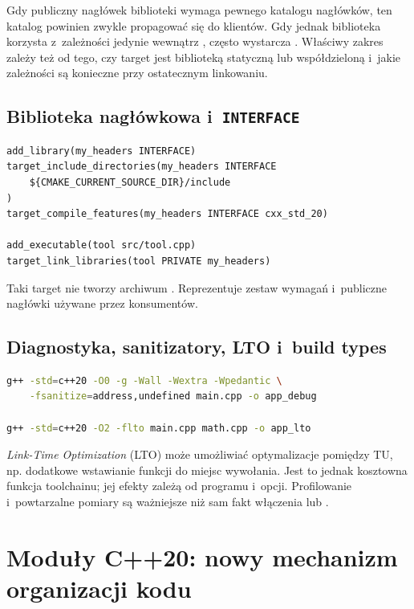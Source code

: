 Gdy publiczny nagłówek biblioteki wymaga pewnego katalogu
nagłówków, ten katalog powinien zwykle propagować się do klientów.
Gdy jednak biblioteka korzysta z~zależności jedynie wewnątrz
, często wystarcza . Właściwy zakres
zależy też od tego, czy target jest biblioteką statyczną lub
współdzieloną i~jakie zależności są konieczne przy ostatecznym
linkowaniu.

\subsection{Biblioteka nagłówkowa i~\texttt{INTERFACE}}

\begin{lstlisting}[language={},caption={Header-only target i wymagania dla klientow.}]
add_library(my_headers INTERFACE)
target_include_directories(my_headers INTERFACE
    ${CMAKE_CURRENT_SOURCE_DIR}/include
)
target_compile_features(my_headers INTERFACE cxx_std_20)

add_executable(tool src/tool.cpp)
target_link_libraries(tool PRIVATE my_headers)
\end{lstlisting}

Taki target nie tworzy archiwum . Reprezentuje zestaw
wymagań i~publiczne nagłówki używane przez konsumentów.

\subsection{Diagnostyka, sanitizatory, LTO i~build types}

\begin{lstlisting}[language=bash,caption={Przykładowe flagi diagnostyczne GCC/Clang.}]
g++ -std=c++20 -O0 -g -Wall -Wextra -Wpedantic \
    -fsanitize=address,undefined main.cpp -o app_debug

g++ -std=c++20 -O2 -flto main.cpp math.cpp -o app_lto
\end{lstlisting}

\emph{Link-Time Optimization} (LTO) może umożliwiać optymalizacje
pomiędzy TU, np. dodatkowe wstawianie funkcji do miejsc wywołania.
Jest to jednak kosztowna funkcja toolchainu; jej efekty zależą od
programu i~opcji. Profilowanie i~powtarzalne pomiary są ważniejsze
niż sam fakt włączenia \code{-O3} lub \code{-flto}.

\section{Moduły C++20: nowy mechanizm organizacji kodu}
\label{sec:cpp17-modules}

